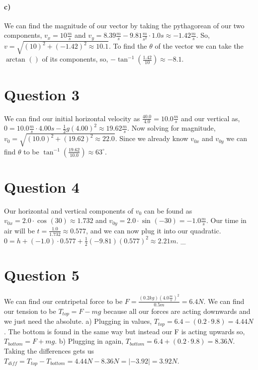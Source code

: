 \documentclass[a4paper]{article}
\begin{document}
\paragraph{c)} We can find the magnitude of our vector by taking the pythagorean of our two components, $ v_x = 10 \frac{ m }{ s }  $ and $ v_y = 8.39 \frac{ m }{ s } - 9.81 \frac{ m }{ s^2 } \cdot 1.0s \approx -1.42 \frac{ m }{ s } $. So, $ v= \sqrt{ \left( 10 \right) ^2+ \left( -1.42 \right) ^2 \approx 10.1} $. To find the $ \theta $ of the vector we can take the $ \arctan^{  }\left(  \right) $ of its components, so, $ -\tan^{ -1 } \left( \frac{ 1.42 }{ 10 }  \right) \approx -8.1 $. 

\section*{Question 3}%
\label{sec:Question 3}
We can find our initial horizontal velocity as $ \frac{ 40.0 }{ 4.0 }= 10.0 \frac{ m }{ s }  $ and our vertical as, $ 0 = 10.0 \frac{ m }{ s } \cdot 4.00s -\frac{ 1 }{ 2 } g\left( 4.00 \right) ^2 \approx 19.62 \frac{ m }{ s } $. Now solving for magnitude, $ v_0 = \sqrt{ \left( 10.0 \right) ^2 + \left( 19.62 \right) ^2 \approx 22.0} $. Since we already know $ v_{ 0x } $ and $ v_{ 0y } $ we can find $ \theta $ to be $ \tan^{ -1 } \left( \frac{ 19.62 }{ 10.0 } \right) \approx 63^{ \circ } $. 

\section*{Question 4}%
\label{sec:Question 4}
Our horizontal and vertical components of $ v_0 $ can be found as $ v_{ 0x }= 2.0 \cdot \cos^{  } \left( 30 \right) \approx 1.732 $ and $ v_{ 0y }= 2.0 \cdot \sin^{  } \left( -30 \right) = -1.0 \frac{ m }{ s }  $. Our time in air will be $ t= \frac{ 1.0 }{ 1.732 } \approx 0.577 $, and we can now plug it into our quadratic. $ 0 = h+ \left( -1.0 \right) \cdot 0.577 + \frac{ 1 }{ 2 } \left( -9.81 \right) \left( 0.577 \right) ^2 \approx 2.21m $.
_
\section*{Question 5}%
\label{sec:Question 5}
We can find our centripetal force to be $ F = \frac{ \left( 0.2kg \right) \left( 4.0 \frac{ m }{ s }  \right)^2  }{ 0.5m } = 6.4N  $. We can find our tension to be $ T_{ top } = F -mg $ because all our forces are acting downwards and we just need the absolute. a) Plugging in values, $ T_{ top }= 6.4 - \left( 0.2 \cdot 9.8 \right) = 4.44N $. The bottom is found in the same way but instead our F is acting upwards so, $ T_{ bottom } = F + mg $. b) Plugging in again, $ T_{ bottom }=6.4 + \left( 0.2 \cdot 9.8 \right) = 8.36N $. Taking the differences gets us $ T_{ diff  } = T_{ top } - T_{ bottom } = 4.44N - 8.36N = \left|-3.92\right| = 3.92N $. 
\end{document}
